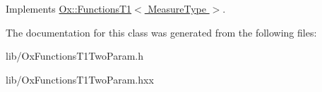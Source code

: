 Implements \hyperlink{class_ox_1_1_functions_t1_a2246ea540016c650d5a18100697eacb8}{Ox\-::\-Functions\-T1$<$ Measure\-Type $>$}.



The documentation for this class was generated from the following files\-:\begin{DoxyCompactItemize}
\item 
lib/Ox\-Functions\-T1\-Two\-Param.\-h\item 
lib/Ox\-Functions\-T1\-Two\-Param.\-hxx\end{DoxyCompactItemize}
